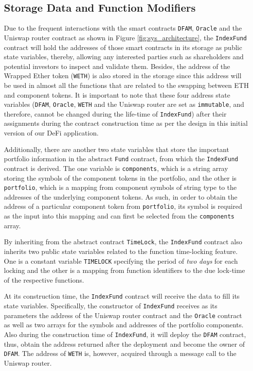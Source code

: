 \subsection{Storage Data and Function Modifiers}
Due to the frequent interactions with the smart contracts \texttt{DFAM}, \texttt{Oracle} and the Uniswap router contract as shown in Figure \ref{fig:sys_architecture}, the \texttt{IndexFund} contract will hold the addresses of those smart contracts in its storage as public state variables, thereby, allowing any interested parties such as shareholders and potential investors to inspect and validate them. Besides, the address of  the Wrapped Ether token (\texttt{WETH}) is also stored in the storage since this address will be used in almost all the functions that are related to the swapping between ETH and component tokens. It is important to note that these four address state variables (\texttt{DFAM},  \texttt{Oracle}, \texttt{WETH} and the Uniswap router are set as \texttt{immutable}, and therefore, cannot be changed during the life-time of \texttt{IndexFund}) after their assignments during the contract construction time as per the design in this initial version of our DeFi application.

Additionally, there are another two state variables that store the important portfolio information in the abstract \texttt{Fund} contract, from which the \texttt{IndexFund} contract is derived. The one variable is \texttt{components}, which is a string array storing the symbols of the component tokens in the portfolio, and the other is \texttt{portfolio}, which is a mapping from component symbols of string type to the addresses of the underlying component tokens. As such, in order to obtain the address of a particular component token from \texttt{portfolio}, its symbol is required as the input into this mapping and can first be selected from the \texttt{components} array. 

By inheriting from the abstract contract \texttt{TimeLock}, the \texttt{IndexFund} contract also inherits two public state variables related to the function time-locking feature. One is a constant variable \texttt{TIMELOCK} specifying the period of \textit{two days} for each locking and the other is a mapping from function identifiers to the due lock-time of the respective functions.

At its construction time, the \texttt{IndexFund} contract will receive the data to fill its state variables. Specifically, the constructor of \texttt{IndexFund} receives as its parameters the address of the Uniswap router contract and the \texttt{Oracle} contract as well as two arrays for the symbols and addresses of the portfolio components. Also during the construction time of \texttt{IndexFund}, it will deploy the \texttt{DFAM} contract, thus, obtain the address returned after the deployment and become the owner of \texttt{DFAM}. The address of \texttt{WETH} is, however, acquired through a message call to the Uniswap router.

